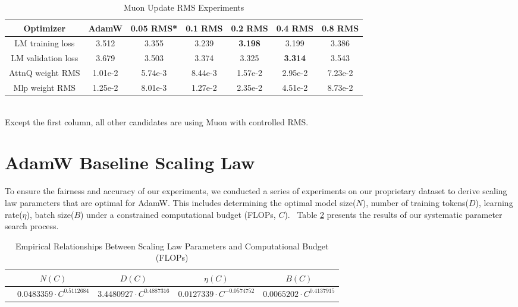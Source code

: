 \begin{table}[ht]
\small
\centering
\caption{Muon Update RMS Experiments}
\label{tab:muonrms}
\begin{tabular}{c|c|c|c|c|c|c}
\toprule
Optimizer & AdamW & 0.05 RMS* & 0.1 RMS & 0.2 RMS & 0.4 RMS & 0.8 RMS\\
\midrule
LM training loss & 3.512 & 3.355 & 3.239 & \textbf{3.198} & 3.199 & 3.386  \\
LM validation loss & 3.679 & 3.503 & 3.374 & 3.325 & \textbf{3.314} & 3.543 \\
AttnQ weight RMS & 1.01e-2 & 5.74e-3 & 8.44e-3 & 1.57e-2 & 2.95e-2 & 7.23e-2 \\
Mlp weight RMS & 1.25e-2 & 8.01e-3 & 1.27e-2 & 2.35e-2 & 4.51e-2 & 8.73e-2 \\
\bottomrule
\end{tabular}
\\ \footnotesize{\small *Except the first column, all other candidates are using Muon with controlled RMS.} 
\end{table}


\section{AdamW Baseline Scaling Law}
\label{sec:appendix:scaling}

To ensure the fairness and accuracy of our experiments, we conducted a series of experiments on our proprietary dataset to derive scaling law parameters that are optimal for AdamW. This includes determining the optimal model size($N$), number of training tokens($D$), learning rate($\eta$), batch size($B$) under a constrained computational budget (FLOPs, $C$).~\citep{kaplan2020scalinglawsneurallanguage,hoffmann2022trainingcomputeoptimallargelanguage,bi2024deepseek} Table \ref{tab:dense_scaling_param} presents the results of our systematic parameter search process.

\begin{table}[ht]
\small
\centering
\caption{Empirical Relationships Between Scaling Law Parameters and Computational Budget (FLOPs)}
\label{tab:dense_scaling_param}
\begin{tabular}{l c|c|c|c}
\toprule
 & $N(C)$ & $D(C)$ & $\eta(C)$ & $B(C)$ \\
\midrule
 & $0.0483359 \cdot C^{0.5112684}$ & $3.4480927 \cdot C^{0.4887316}$ & $0.0127339 \cdot C^{-0.0574752} $ & $0.0065202 \cdot C^{0.4137915}$ \\
\bottomrule
\end{tabular}
\end{table}

